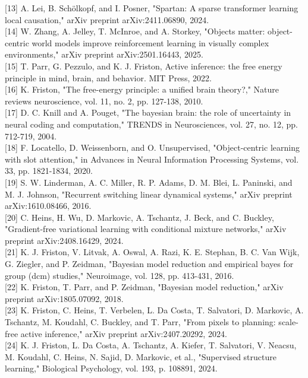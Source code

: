 \documentclass[10pt]{article}
\begin{document}
[13] A. Lei, B. Schölkopf, and I. Posner, "Spartan: A sparse transformer learning local causation," arXiv preprint arXiv:2411.06890, 2024.\\[0pt]
[14] W. Zhang, A. Jelley, T. McInroe, and A. Storkey, "Objects matter: object-centric world models improve reinforcement learning in visually complex environments," arXiv preprint arXiv:2501.16443, 2025.\\[0pt]
[15] T. Parr, G. Pezzulo, and K. J. Friston, Active inference: the free energy principle in mind, brain, and behavior. MIT Press, 2022.\\[0pt]
[16] K. Friston, "The free-energy principle: a unified brain theory?," Nature reviews neuroscience, vol. 11, no. 2, pp. 127-138, 2010.\\[0pt]
[17] D. C. Knill and A. Pouget, "The bayesian brain: the role of uncertainty in neural coding and computation," TRENDS in Neurosciences, vol. 27, no. 12, pp. 712-719, 2004.\\[0pt]
[18] F. Locatello, D. Weissenborn, and O. Unsupervised, "Object-centric learning with slot attention," in Advances in Neural Information Processing Systems, vol. 33, pp. 1821-1834, 2020.\\[0pt]
[19] S. W. Linderman, A. C. Miller, R. P. Adams, D. M. Blei, L. Paninski, and M. J. Johnson, "Recurrent switching linear dynamical systems," arXiv preprint arXiv:1610.08466, 2016.\\[0pt]
[20] C. Heins, H. Wu, D. Markovic, A. Tschantz, J. Beck, and C. Buckley, "Gradient-free variational learning with conditional mixture networks," arXiv preprint arXiv:2408.16429, 2024.\\[0pt]
[21] K. J. Friston, V. Litvak, A. Oswal, A. Razi, K. E. Stephan, B. C. Van Wijk, G. Ziegler, and P. Zeidman, "Bayesian model reduction and empirical bayes for group (dcm) studies," Neuroimage, vol. 128, pp. 413-431, 2016.\\[0pt]
[22] K. Friston, T. Parr, and P. Zeidman, "Bayesian model reduction," arXiv preprint arXiv:1805.07092, 2018.\\[0pt]
[23] K. Friston, C. Heins, T. Verbelen, L. Da Costa, T. Salvatori, D. Markovic, A. Tschantz, M. Koudahl, C. Buckley, and T. Parr, "From pixels to planning: scale-free active inference," arXiv preprint arXiv:2407.20292, 2024.\\[0pt]
[24] K. J. Friston, L. Da Costa, A. Tschantz, A. Kiefer, T. Salvatori, V. Neacsu, M. Koudahl, C. Heins, N. Sajid, D. Markovic, et al., "Supervised structure learning," Biological Psychology, vol. 193, p. 108891, 2024.\\[0pt]
\end{document}
